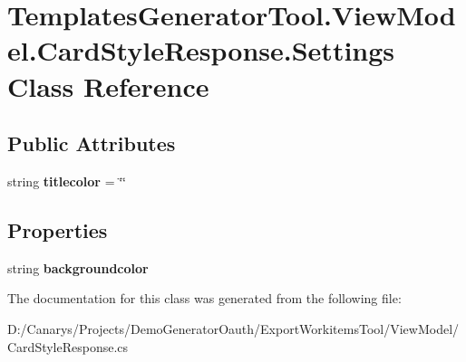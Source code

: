 \hypertarget{class_templates_generator_tool_1_1_view_model_1_1_card_style_response_1_1_settings}{}\section{Templates\+Generator\+Tool.\+View\+Model.\+Card\+Style\+Response.\+Settings Class Reference}
\label{class_templates_generator_tool_1_1_view_model_1_1_card_style_response_1_1_settings}
\subsection*{Public Attributes}
\begin{DoxyCompactItemize}
\item 
\mbox{\label{class_templates_generator_tool_1_1_view_model_1_1_card_style_response_1_1_settings_a63a38f26c177bf95004ede430239370e}} 
string {\bfseries titlecolor} = \char`\"{}\char`\"{}
\end{DoxyCompactItemize}
\subsection*{Properties}
\begin{DoxyCompactItemize}
\item 
\mbox{\label{class_templates_generator_tool_1_1_view_model_1_1_card_style_response_1_1_settings_a1cc406ddec19b956f3fad8d1e0740e1d}} 
string {\bfseries backgroundcolor}
\end{DoxyCompactItemize}


The documentation for this class was generated from the following file\+:\begin{DoxyCompactItemize}
\item 
D\+:/\+Canarys/\+Projects/\+Demo\+Generator\+Oauth/\+Export\+Workitems\+Tool/\+View\+Model/Card\+Style\+Response.\+cs\end{DoxyCompactItemize}
